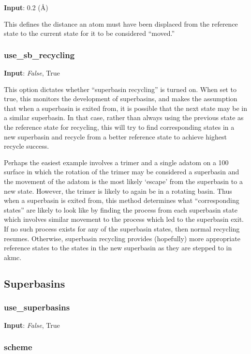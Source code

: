 \documentclass{article}
\begin{document}
\noindent\textbf{Input}:  0.2 (\AA)

This defines the distance an atom must have been displaced from the reference state to the current state for it to be considered ``moved.''

\subsubsection{use\_sb\_recycling}

\noindent\textbf{Input}:  \emph{False}, True

This option dictates whether ``superbasin recycling'' is turned on.  When set to true, this monitors the development of superbasins, and makes the assumption that when a superbasin is exited from, it is possible that the next state may be in a similar superbasin.  In that case, rather than always using the previous state as the reference state for recycling, this will try to find corresponding states in a new superbasin and recycle from a better reference state to achieve highest recycle success.

Perhaps the easiest example involves a trimer and a single adatom on a 100 surface in which the rotation of the trimer may be considered a superbasin and the movement of the adatom is the most likely `escape' from the superbasin to a new state.  However, the trimer is likely to again be in a rotating basin.  Thus when a superbasin is exited from, this method determines what ``corresponding states'' are likely to look like by finding the process from each superbasin state which involves similar movement to the process which led to the superbasin exit.  If no such process exists for any of the superbasin states, then normal recycling resumes.  Otherwise, superbasin recycling provides (hopefully) more appropriate reference states to the states in the new superbasin as they are stepped to in akmc.

\subsection{Superbasins}

\subsubsection{use\_superbasins}

\noindent\textbf{Input}:  \emph{False}, True

\subsubsection{scheme}
\end{document}
